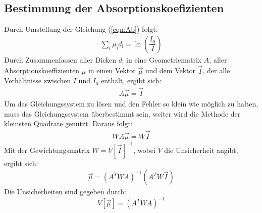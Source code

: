 \subsection{Bestimmung der Absorptionskoefizienten}
\noindent Durch Umstellung der Gleichung (\ref{eqn:Ab}) folgt:
\begin{align}
  \label{eqn:umab}
  \sum\limits_{i}^{}\mu_\mathrm{i} d_\mathrm{i} = \ln\left(\dfrac{I_\mathrm{0}}{I}\right)
\end{align}
Durch Zusammenfassen aller Dicken $d_\mathrm{i}$ in eine Geometriematrix $A$, aller Absorptionskoeffizienten $\mu$ in einen Vektor $\vec{\mu}$ und dem Vektor $\vec{I}$, der alle Verhältnisse zwischen $I$ und $I_\mathrm{0}$ enthält, ergibt sich:
\begin{align}
  \label{egn:Matrixschreibweise}
  A \vec{\mu} = \vec{I}
\end{align}
Um das Gleichungssystem zu lösen und den Fehler so klein wie möglich zu halten, muss das Gleichungssystem überbestimmt sein, weiter wird die Methode der kleinsten Quadrate genutzt. Daraus folgt:
\begin{align}
  \label{eqn:Quadrate}
  W A \vec{\mu} = W \vec{I}
\end{align}
Mit der Gewichtungsmatrix $W=V[\vec{I}]^{-1}$, wobei $V$ die Unsicherheit angibt, ergibt sich:
\begin{align}
  \label{eqn:letzte Gleichung}
  \vec{\mu}=\left(A^TWA\right)^{-1}\left(A^TW\vec{I}\right)
\end{align}
Die Unsicherheiten sind gegeben durch:
\begin{equation}
  V[\vec{\mu}]=\left(A^TWA\right)^{-1}
  \label{eqn:mu}
\end{equation}
